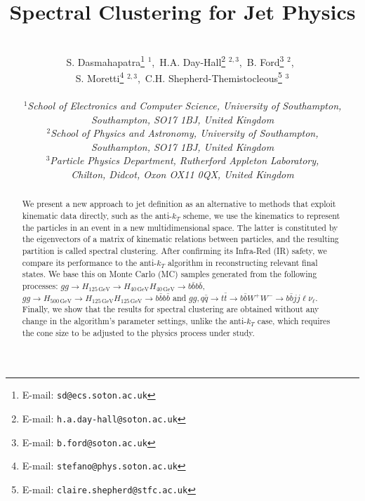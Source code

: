 \documentclass[12pt]{article}
\def\antikt{anti-$k_T$}
\begin{document}
\title{\hfill ~\\[-50mm]
                  \textbf{Spectral Clustering for Jet Physics
                }        }

\author{\\[-5mm]
S. Dasmahapatra\footnote{E-mail: {\tt sd@ecs.soton.ac.uk}} $^{1}$,\
H.A. Day-Hall\footnote{E-mail: {\tt h.a.day-hall@soton.ac.uk}} $^{2,3}$,\
B. Ford\footnote{E-mail: {\tt b.ford@soton.ac.uk}} $^{2}$,\ \\
S. Moretti\footnote{E-mail: {\tt stefano@phys.soton.ac.uk}} $^{2,3}$,\
C.H. Shepherd-Themistocleous\footnote{E-mail: {\tt claire.shepherd@stfc.ac.uk}} $^{3}$
\\ \\
\emph{\small $^1$School of Electronics and Computer Science, University of Southampton,}\\
\emph{\small Southampton, SO17 1BJ, United Kingdom}\\
\emph{\small $^2$School of Physics and Astronomy, University of Southampton,}\\
\emph{\small Southampton, SO17 1BJ, United Kingdom}\\
\emph{\small  $^3$Particle Physics Department, Rutherford Appleton Laboratory,}\\
\emph{\small Chilton, Didcot, Oxon OX11 0QX, United Kingdom}\\[4mm]
}
%
\maketitle
%
\vspace*{-10mm}
%
\begin{abstract}
\noindent
We present a new approach to jet definition as an alternative to methods that exploit kinematic data directly, such as the anti-$k_T$ scheme,
we use the kinematics to represent the particles in an event in a new multidimensional space.
The latter is constituted by the eigenvectors of a matrix of kinematic relations between particles, and the resulting partition is called spectral clustering.
After confirming its Infra-Red (IR) safety, we compare 
its performance to the \antikt{} algorithm in reconstructing relevant final states. 
We base this on Monte Carlo (MC) samples generated from the following processes: 
\(gg\to H_{125\,\text{GeV}} \rightarrow H_{40\,\text{GeV}} H_{40\,\text{GeV}} \rightarrow b \bar{b} b \bar{b}\),
\(gg\to H_{500\,\text{GeV}} \rightarrow H_{125\,\text{GeV}} H_{125\,\text{GeV}} \rightarrow b \bar{b} b \bar{b}\)
and
\(gg,q\bar q\to t\bar t\to b\bar b W^+W^-\to b\bar b jj \ell\nu_\ell\).
Finally, we show that the  results for spectral clustering are obtained without any change in the algorithm's parameter settings, unlike the \antikt{} case, which requires the cone size to be adjusted to the physics process under study.
 \end{abstract}
\thispagestyle{empty}
\vfill
\newpage
%
    
    \FloatBarrier
    
    \FloatBarrier
    
    \FloatBarrier
    
    \FloatBarrier
    
    \FloatBarrier
\end{document}
